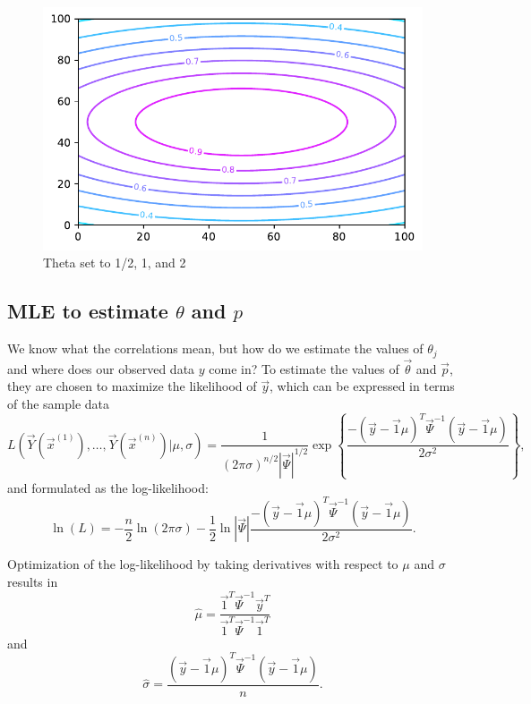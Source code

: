 \documentclass[
  letterpaper,
  DIV=11,
  numbers=noendperiod]{scrreprt}
\begin{document}
\begin{figure}[H]

{\centering \includegraphics{006_num_gp_files/figure-pdf/fig-theta12-output-1.pdf}

}

\caption{\label{fig-theta12}Theta set to 1/2, 1, and 2}

\end{figure}

\hypertarget{mle-to-estimate-theta-and-p}{%
\subsection{\texorpdfstring{MLE to estimate \(\theta\) and
\(p\)}{MLE to estimate \textbackslash theta and p}}\label{mle-to-estimate-theta-and-p}}

We know what the correlations mean, but how do we estimate the values of
\(\theta_j\) and where does our observed data \(y\) come in? To estimate
the values of \(\vec{\theta}\) and \(\vec{p}\), they are chosen to
maximize the likelihood of \(\vec{y}\), which can be expressed in terms
of the sample data
\[L\left(\vec{Y}(\vec{x}^{(1)}), \ldots, \vec{Y}(\vec{x}^{(n)}) | \mu, \sigma \right) = \frac{1}{(2\pi \sigma)^{n/2} |\vec{\Psi}|^{1/2}} \exp\left\{ \frac{-(\vec{y} - \vec{1}\mu)^T \vec{\Psi}^{-1}(\vec{y} - \vec{1}\mu) }{2 \sigma^2}\right\},\]
and formulated as the log-likelihood:
\[\ln(L) = - \frac{n}{2} \ln(2\pi \sigma) - \frac{1}{2} \ln |\vec{\Psi}| \frac{-(\vec{y} - \vec{1}\mu)^T \vec{\Psi}^{-1}(\vec{y} - \vec{1}\mu) }{2 \sigma^2}.\]

Optimization of the log-likelihood by taking derivatives with respect to
\(\mu\) and \(\sigma\) results in
\[\hat{\mu} = \frac{\vec{1}^T \vec{\Psi}^{-1} \vec{y}^T}{\vec{1}^T \vec{\Psi}^{-1} \vec{1}^T}\]
and
\[\hat{\sigma} = \frac{(\vec{y} - \vec{1}\mu)^T \vec{\Psi}^{-1}(\vec{y} - \vec{1}\mu)}{n}.\]
\end{document}
